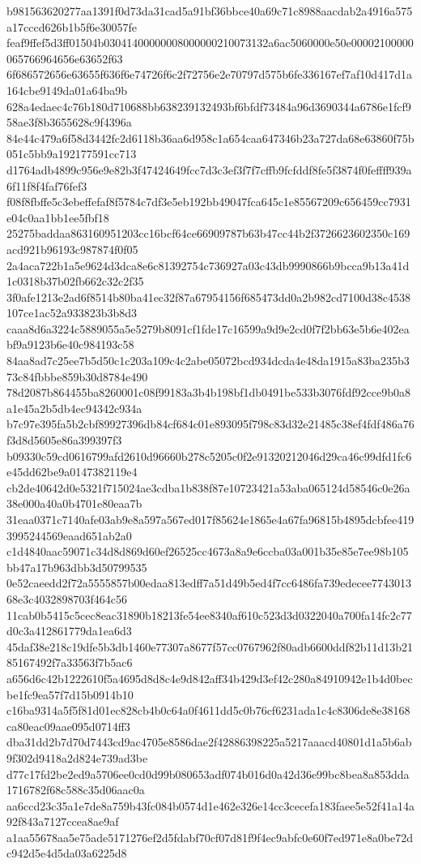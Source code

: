 {b981563620277aa1391f0d73da31cad5a91bf36bbce40a69c71c8988aacdab2a4916a575a17cccd626b1b5f6e30057fe
feaf9ffef5d3ff01504b03041400000008000000210073132a6ac5060000e50e00002100000065766964656e63652f63
6f686572656e63655f636f6e74726f6c2f72756e2e70797d575b6fe336167ef7af10d417d1a164cbe9149da01a64ba9b
628a4edaec4c76b180d710688bb638239132493bf6bfdf73484a96d3690344a6786e1fcf958ae3f8b3655628c9f4396a
84e44c479a6f58d3442fc2d6118b36aa6d958c1a654caa647346b23a727da68e63860f75b051c5bb9a192177591cc713
d1764adb4899c956e9e82b3f47424649fcc7d3c3ef3f7f7cffb9fcfddf8fe5f3874f0feffff939a6f11f8f4faf76fef3
f08f8fbffe5c3ebeffefaf8f5784c7df3e5eb192bb49047fca645c1e85567209c656459cc7931e04c0aa1bb1ee5fbf18
25275baddaa863160951203cc16bcf64ce66909787b63b47cc44b2f3726623602350c169acd921b96193c987874f0f05
2a4aca722b1a5e9624d3dca8e6c81392754c736927a03c43db9990866b9bcca9b13a41d1c0318b37b02fb662c32c2f35
3f0afe1213e2ad6f8514b80ba41ec32f87a67954156f685473dd0a2b982cd7100d38c4538107ce1ac52a933823b3b8d3
caaa8d6a3224c5889055a5e5279b8091cf1fde17c16599a9d9e2cd0f7f2bb63e5b6e402eabf9a9123b6e40c984193c58
84aa8ad7c25ee7b5d50c1c203a109c4c2abe05072bcd934dcda4e48da1915a83ba235b373c84fbbbe859b30d8784e490
78d2087b864455ba8260001c08f99183a3b4b198bf1db0491be533b3076fdf92cce9b0a8a1e45a2b5db4ec94342c934a
b7c97e395fa5b2cbf89927396db84cf684c01e893095f798c83d32e21485c38ef4fdf486a76f3d8d5605e86a399397f3
b09330c59cd0616799afd2610d96660b278c5205c0f2e91320212046d29ca46c99dfd1fc6e45dd62be9a0147382119e4
cb2de40642d0e5321f715024ae3cdba1b838f87e10723421a53aba065124d58546c0e26a38e000a40a0b4701e80eaa7b
31eaa0371c7140afe03ab9e8a597a567ed017f85624e1865e4a67fa96815b4895dcbfee4193995244569eaad651ab2a0
c1d4840aac59071c34d8d869d60ef26525cc4673a8a9e6ccba03a001b35e85e7ee98b105bb47a17b963dbb3d50799535
0e52caeedd2f72a5555857b00edaa813edff7a51d49b5ed4f7cc6486fa739edecee774301368e3c4032898703f464c56
11cab0b5415c5cec8eac31890b18213fe54ee8340af610c523d3d0322040a700fa14fc2c77d0c3a412861779da1ea6d3
45daf38e218c19dfe5b3db1460e77307a8677f57cc0767962f80adb6600ddf82b11d13b2185167492f7a33563f7b5ac6
a656d6c42b1222610f5a4695d8d8c4e9d842aff34b429d3ef42c280a84910942e1b4d0becbe1fc9ea57f7d15b0914b10
c16ba9314a5f5f81d01ec828cb4b0c64a0f4611dd5c0b76cf6231ada1c4c8306de8e38168ca80eac09aae095d0714ff3
dba31dd2b7d70d7443cd9ac4705e8586dae2f42886398225a5217aaacd40801d1a5b6ab9f302d9418a2d824e739ad3be
d77c17fd2be2ed9a5706ee0cd0d99b080653adf074b016d0a42d36e99bc8bea8a853dda1716782f68c588c35d06aac0a
aa6ccd23c35a1e7de8a759b43fc084b0574d1e462e326e14cc3cecefa183faee5e52f41a14a92f843a7127ccea8ae9af
a1aa55678aa5e75ade5171276ef2d5fdabf70cf07d81f9f4ec9abfc0e60f7ed971e8a0be72dc942d5e4d5da03a6225d8
}
